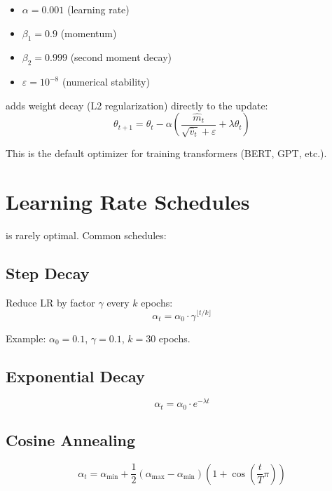 \begin{itemize}
    \item $\alpha = 0.001$ (learning rate)
    \item $\beta_1 = 0.9$ (momentum)
    \item $\beta_2 = 0.999$ (second moment decay)
    \item $\varepsilon = 10^{-8}$ (numerical stability)
\end{itemize}

 adds weight decay (L2 regularization) directly to the update:
\begin{equation}
    \theta_{t+1} = \theta_t - \alpha \left( \frac{\hat{m}_t}{\sqrt{\hat{v}_t} + \varepsilon} + \lambda \theta_t \right)
\end{equation}

This is the default optimizer for training transformers (BERT, GPT, etc.).




\newpage
\section{Learning Rate Schedules}

 is rarely optimal. Common schedules:

\subsection{Step Decay}
Reduce LR by factor $\gamma$ every $k$ epochs:
\begin{equation}
    \alpha_t = \alpha_0 \cdot \gamma^{\lfloor t/k \rfloor}
\end{equation}

Example: $\alpha_0 = 0.1$, $\gamma = 0.1$, $k = 30$ epochs.

\subsection{Exponential Decay}
\begin{equation}
    \alpha_t = \alpha_0 \cdot e^{-\lambda t}
\end{equation}

\subsection{Cosine Annealing}
\begin{equation}
    \alpha_t = \alpha_{\min} + \frac{1}{2}(\alpha_{\max} - \alpha_{\min})\left(1 + \cos\left(\frac{t}{T}\pi\right)\right)
\end{equation}

